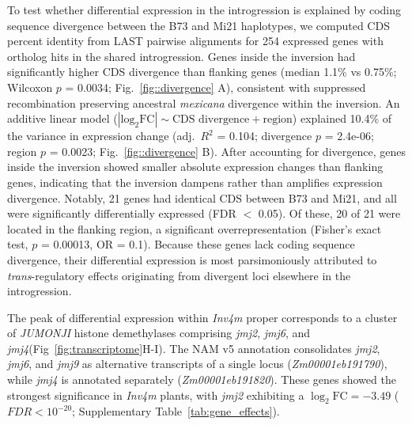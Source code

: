 \documentclass[9pt,twocolumn,twoside]{rilabRxiv}
\newcommand{\invfour}{\textit{Inv4m}\xspace}
\newcommand{\jmjii}{\textit{jmj2}\xspace}
\newcommand{\jmjiv}{\textit{jmj4}\xspace}
\newcommand{\jmjvi}{\textit{jmj6}\xspace}
\newcommand{\jmjix}{\textit{jmj9}\xspace}
\begin{document}
To test whether differential expression in the introgression is explained by coding sequence divergence between the B73 and Mi21 haplotypes, we computed CDS percent identity from LAST pairwise alignments for 254 expressed genes with ortholog hits in the shared introgression.
Genes inside the inversion had significantly higher CDS divergence than flanking genes (median 1.1\% vs 0.75\%; Wilcoxon $p$ = 0.0034; Fig.~\ref{fig::divergence} A), consistent with suppressed recombination preserving ancestral \textit{mexicana} divergence within the inversion.
An additive linear model ($|\text{log}_2\text{FC}| \sim \text{CDS divergence} + \text{region}$) explained 10.4\% of the variance in expression change (adj.\ $R^2$ = 0.104; divergence $p$ = 2.4e-06; region $p$ = 0.0023; Fig.~\ref{fig::divergence} B).
After accounting for divergence, genes inside the inversion showed smaller absolute expression changes than flanking genes, indicating that the inversion dampens rather than amplifies expression divergence.
Notably, 21 genes had identical CDS between B73 and Mi21, and all were significantly differentially expressed (FDR $<$ 0.05).
Of these, 20 of 21 were located in the flanking region, a significant overrepresentation (Fisher's exact test, $p$ = 0.00013, OR = 0.1).
Because these genes lack coding sequence divergence, their differential expression is most parsimoniously attributed to \textit{trans}-regulatory effects originating from divergent loci elsewhere in the introgression.

The peak of differential expression within \invfour proper corresponds to a cluster of \textit{JUMONJI} histone demethylases comprising \jmjii, \jmjvi, and \jmjiv (Fig~\ref{fig:transcriptome}H-I).
The NAM v5 annotation consolidates \jmjii, \jmjvi, and \jmjix as alternative transcripts of a single locus (\textit{Zm00001eb191790}), while \jmjiv is annotated separately (\textit{Zm00001eb191820}).
These genes showed the strongest significance in \invfour plants, with \jmjii exhibiting a $\log_2 \text{FC} = -3.49$ ($\textit{FDR} < 10^{-20}$; Supplementary Table~\ref{tab:gene_effects}).
\end{document}
